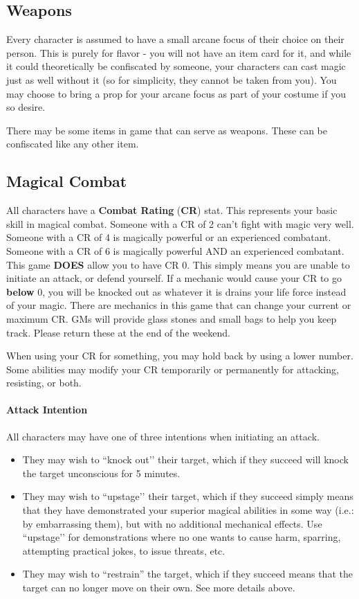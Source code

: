 \documentclass[sheet]{GL2020}
\begin{document}
\subsection{Weapons}
Every character is assumed to have a small arcane focus of their choice on their person. This is purely for flavor - you will not have an item card for it, and while it could theoretically be confiscated by someone, your characters can cast magic just as well without it (so for simplicity, they cannot be taken from you). You may choose to bring a prop for your arcane focus as part of your costume if you so desire.

There may be some items in game that can serve as weapons. These can be confiscated like any other item.

\subsection{Magical Combat}
All characters have a {\bf Combat Rating} ({\bf CR}) stat. This represents your basic skill in magical combat. Someone with a CR of 2 can't fight with magic very well. Someone with a CR of 4 is magically powerful or an experienced combatant. Someone with a CR of 6 is magically powerful AND an experienced combatant. This game \textbf{DOES} allow you to have CR 0. This simply means you are unable to initiate an attack, or defend yourself. If a mechanic would cause your CR to go \textbf{below} 0, you will be knocked out as whatever it is drains your life force instead of your magic. There are mechanics in this game that can change your current or maximum CR. GMs will provide glass stones and small bags to help you keep track. Please return these at the end of the weekend.

When using your CR for something, you may hold back by using a lower number. Some abilities may modify your CR temporarily or permanently for attacking, resisting, or both.

\paragraph{Attack Intention} All characters may have one of three intentions when initiating an attack. 
\begin{itemize}
	\item They may wish to ``knock out'’ their target, which if they succeed will knock the target unconscious for 5 minutes. 
	\item They may wish to ``upstage'’ their target, which if they succeed simply means that they have demonstrated your superior magical abilities in some way (i.e.: by embarrassing them), but with no additional mechanical effects. Use ``upstage'’ for demonstrations where no one wants to cause harm, sparring, attempting practical jokes, to issue threats, etc. \
	\item They may wish to ``restrain'' the target, which if they succeed means that the target can no longer move on their own. See more details above. 
\end{itemize}
\end{document}
